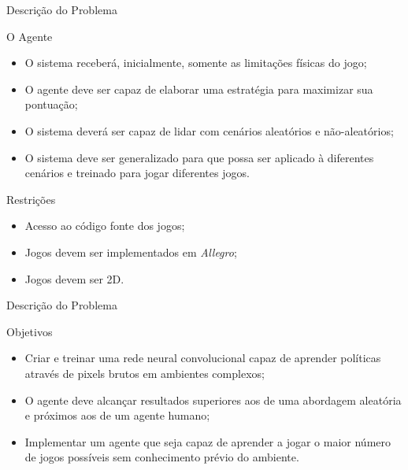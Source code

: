 \documentclass[aspectratio=169]{beamer}
\begin{document}
\begin{frame}{Descrição do Problema}
	\begin{block}{\large{{O Agente}}}
		\begin{itemize}
			\item O sistema receberá, inicialmente, somente as limitações físicas do jogo;

			\item O agente deve ser capaz de elaborar uma estratégia para maximizar sua pontuação;

			\item O sistema deverá ser capaz de lidar com cenários aleatórios e não-aleatórios;

			\item O sistema deve ser generalizado para que possa ser aplicado à diferentes cenários e treinado para jogar diferentes jogos.
		\end{itemize}
	\end{block}
	\pause
	\begin{block}{\large{{Restrições}}}
		\begin{itemize}
			\item Acesso ao código fonte dos jogos;
			\item Jogos devem ser implementados em \textit{Allegro};
			\item Jogos devem ser 2D.
		\end{itemize}
	\end{block}

\end{frame}

\begin{frame}{Descrição do Problema}
	
	\begin{block}{\large{{Objetivos}}}
		\begin{itemize}
			\item Criar e treinar uma rede neural convolucional capaz de aprender políticas através de pixels brutos em ambientes complexos;

			\item O agente deve alcançar resultados superiores aos de uma abordagem aleatória e próximos aos de um agente humano;

			\item Implementar um agente que seja capaz de aprender a jogar o maior número de jogos possíveis sem conhecimento prévio do ambiente.
		\end{itemize}
	\end{block}
\end{frame}
\end{document}

